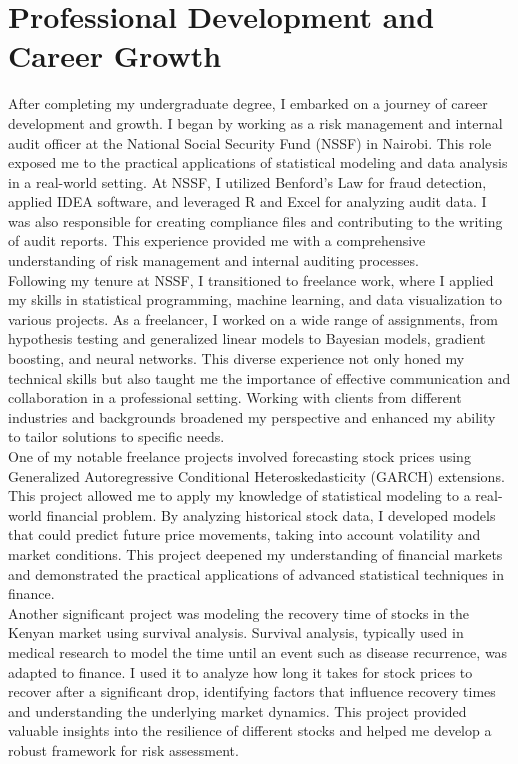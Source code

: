 \documentclass[12pt,a4paper,sans,english]{report}
\begin{document}
\chapter{Professional Development and Career Growth}

\noindent After completing my undergraduate degree, I embarked on a journey of career development and growth. I began by working as a risk management and internal audit officer at the National Social Security Fund (NSSF) in Nairobi. This role exposed me to the practical applications of statistical modeling and data analysis in a real-world setting. At NSSF, I utilized Benford's Law for fraud detection, applied IDEA software, and leveraged R and Excel for analyzing audit data. I was also responsible for creating compliance files and contributing to the writing of audit reports. This experience provided me with a comprehensive understanding of risk management and internal auditing processes.\\

\noindent Following my tenure at NSSF, I transitioned to freelance work, where I applied my skills in statistical programming, machine learning, and data visualization to various projects. As a freelancer, I worked on a wide range of assignments, from hypothesis testing and generalized linear models to Bayesian models, gradient boosting, and neural networks. This diverse experience not only honed my technical skills but also taught me the importance of effective communication and collaboration in a professional setting. Working with clients from different industries and backgrounds broadened my perspective and enhanced my ability to tailor solutions to specific needs.\\

\noindent One of my notable freelance projects involved forecasting stock prices using Generalized Autoregressive Conditional Heteroskedasticity (GARCH) extensions. This project allowed me to apply my knowledge of statistical modeling to a real-world financial problem. By analyzing historical stock data, I developed models that could predict future price movements, taking into account volatility and market conditions. This project deepened my understanding of financial markets and demonstrated the practical applications of advanced statistical techniques in finance.\\

\noindent Another significant project was modeling the recovery time of stocks in the Kenyan market using survival analysis. Survival analysis, typically used in medical research to model the time until an event such as disease recurrence, was adapted to finance. I used it to analyze how long it takes for stock prices to recover after a significant drop, identifying factors that influence recovery times and understanding the underlying market dynamics. This project provided valuable insights into the resilience of different stocks and helped me develop a robust framework for risk assessment.\\
\end{document}
